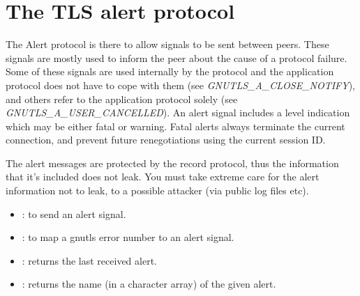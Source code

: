 \section{The TLS alert protocol}
\label{alert}

The Alert protocol
is there to allow signals to be sent between peers.
These signals are mostly used to inform the peer about the cause of
a protocol failure. Some of these signals are used internally by the
protocol and the application protocol does not have to cope with them
(see \emph{GNUTLS\_A\_CLOSE\_NOTIFY}), and others refer to the
application protocol solely (see \emph{GNUTLS\_A\_USER\_CANCELLED}).
An alert signal includes a level indication which may be either
fatal or warning. Fatal alerts always terminate the current connection,
and prevent future renegotiations using the current session ID.

\par The alert messages are protected by the record protocol, thus
the information that it's included does not leak. You must take
extreme care for the alert information not to leak, to a possible attacker
(via public log files etc).

\par
\begin{itemize}
\item {}:
to send an alert signal.
\item {}:
to map a gnutls error number to an alert signal.
\item {}:
returns the last received alert.
\item {}:
returns the name (in a character array) of the given alert.
\end{itemize}


